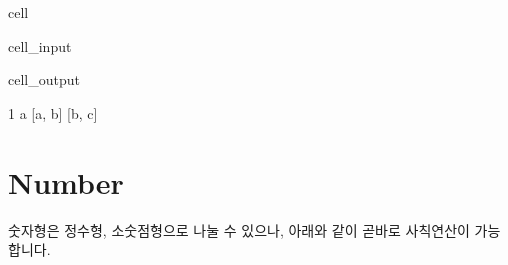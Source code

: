 \documentclass[letterpaper,10pt,english]{jupyterBook}
\begin{document}
\begin{sphinxuseclass}{cell}\begin{sphinxVerbatimInput}

\begin{sphinxuseclass}{cell_input}
\begin{sphinxVerbatim}[commandchars=\\\{\}]
  \PYG{p}{[}\PYG{p}{]}
   \PYG{p}{[}\PYG{p}{]}

\PYG{p}{[}\PYG{p}{]}
\PYG{p}{[}\PYG{p}{]}
\PYG{p}{[}\PYG{p}{]} 
\PYG{p}{[}\PYG{p}{]} 
\end{sphinxVerbatim}

\end{sphinxuseclass}\end{sphinxVerbatimInput}
\begin{sphinxVerbatimOutput}

\begin{sphinxuseclass}{cell_output}
\begin{sphinxVerbatim}[commandchars=\\\{\}]
1
a
[\PYGZsq{}a\PYGZsq{}, \PYGZsq{}b\PYGZsq{}]
[\PYGZsq{}b\PYGZsq{}, \PYGZsq{}c\PYGZsq{}]
\end{sphinxVerbatim}

\end{sphinxuseclass}\end{sphinxVerbatimOutput}

\end{sphinxuseclass}

\section{Number}
\label{\detokenize{chapter2/2.1.1_Python_Basics:number}}
\sphinxAtStartPar
숫자형은 정수형, 소숫점형으로 나눌 수 있으나, 아래와 같이 곧바로 사칙연산이 가능합니다.
\end{document}
